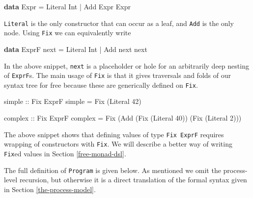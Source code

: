 \documentclass[runningheads,plain]{llncs}
\newenvironment{Shaded}{}{}
\newcommand{\KeywordTok}[1]{\textcolor[rgb]{0.00,0.44,0.13}{\textbf{#1}}}
\newcommand{\DataTypeTok}[1]{\textcolor[rgb]{0.56,0.13,0.00}{#1}}
\newcommand{\DecValTok}[1]{\textcolor[rgb]{0.25,0.63,0.44}{#1}}
\newcommand{\OtherTok}[1]{\textcolor[rgb]{0.00,0.44,0.13}{#1}}
\newcommand{\FunctionTok}[1]{\textcolor[rgb]{0.02,0.16,0.49}{#1}}
\newcommand{\NormalTok}[1]{#1}
\begin{document}
\begin{Shaded}
\begin{Highlighting}[]
\KeywordTok{data} \DataTypeTok{Expr}
    \FunctionTok{=} \DataTypeTok{Literal} \DataTypeTok{Int}
    \FunctionTok{|} \DataTypeTok{Add} \DataTypeTok{Expr} \DataTypeTok{Expr} 
\end{Highlighting}
\end{Shaded}

\texttt{Literal} is the only constructor that can occur as a leaf, and
\texttt{Add} is the only node. Using \texttt{Fix} we can equivalently
write

\begin{Shaded}
\begin{Highlighting}[]
\KeywordTok{data} \DataTypeTok{ExprF}\NormalTok{ next}
    \FunctionTok{=} \DataTypeTok{Literal} \DataTypeTok{Int}
    \FunctionTok{|} \DataTypeTok{Add}\NormalTok{ next next }
\end{Highlighting}
\end{Shaded}

In the above snippet, \texttt{next} is a placeholder or hole for an
arbitrarily deep nesting of \texttt{ExprF}s. The main usage of
\texttt{Fix} is that it gives traversals and folds of our syntax tree
for free because these are generically defined on \texttt{Fix}.

\begin{Shaded}
\begin{Highlighting}[]
\OtherTok{simple ::} \DataTypeTok{Fix} \DataTypeTok{ExprF}
\NormalTok{simple }\FunctionTok{=} \DataTypeTok{Fix}\NormalTok{ (}\DataTypeTok{Literal} \DecValTok{42}\NormalTok{)}

\OtherTok{complex ::} \DataTypeTok{Fix} \DataTypeTok{ExprF}
\NormalTok{complex }\FunctionTok{=} 
    \DataTypeTok{Fix}\NormalTok{ (}\DataTypeTok{Add}\NormalTok{ (}\DataTypeTok{Fix}\NormalTok{ (}\DataTypeTok{Literal} \DecValTok{40}\NormalTok{)) (}\DataTypeTok{Fix}\NormalTok{ (}\DataTypeTok{Literal} \DecValTok{2}\NormalTok{)))}
\end{Highlighting}
\end{Shaded}

The above snippet shows that defining values of type \texttt{Fix\ ExprF}
requires wrapping of constructors with \texttt{Fix}. We will describe a
better way of writing \texttt{Fix}ed values in Section
\ref{free-monad-dsl}.

The full definition of \texttt{Program} is given below. As mentioned we
omit the process-level recursion, but otherwise it is a direct translation of the formal syntax given in Section \ref{the-process-model}.
\end{document}
